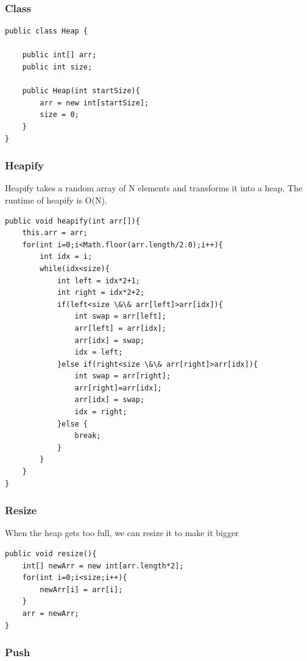 \documentclass[11pt,oneside]{book}
\begin{document}
\subsubsection{Class}

\begin{lstlisting}
public class Heap {

    public int[] arr;
    public int size;
    
    public Heap(int startSize){
        arr = new int[startSize];
        size = 0;
    }
}
\end{lstlisting}

\subsubsection{Heapify}

Heapify takes a random array of N elements and transforms it into a heap. The runtime of heapify is O(N).

\begin{lstlisting}
public void heapify(int arr[]){
    this.arr = arr;
    for(int i=0;i<Math.floor(arr.length/2.0);i++){
        int idx = i;
        while(idx<size){
            int left = idx*2+1;
            int right = idx*2+2;
            if(left<size \&\& arr[left]>arr[idx]){
                int swap = arr[left];
                arr[left] = arr[idx];
                arr[idx] = swap;
                idx = left;
            }else if(right<size \&\& arr[right]>arr[idx]){
                int swap = arr[right];
                arr[right]=arr[idx];
                arr[idx] = swap;
                idx = right;
            }else {
                break;
            }
        }
    }
}
\end{lstlisting}

\subsubsection{Resize}

When the heap gets too full, we can resize it to make it bigger

\begin{lstlisting}
public void resize(){
    int[] newArr = new int[arr.length*2];
    for(int i=0;i<size;i++){
        newArr[i] = arr[i];
    }
    arr = newArr;
}
\end{lstlisting}

\subsubsection{Push}
\end{document}

